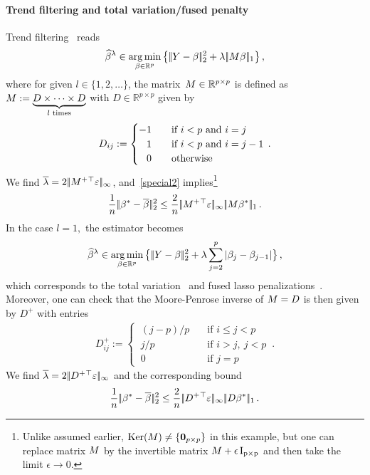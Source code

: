 \documentclass[bj]{imsart}
\newcommand{\normsup}[1]{\ensuremath{\!|\!| #1 | \! |_{\infty}}}
\newcommand{\normone}[1]{\ensuremath{\!|\!| #1 | \! |_{1}}}
\newcommand{\normtwo}[1]{\ensuremath{\!|\!| #1 | \! |_{2}}}
\newcommand{\1}{{\rm 1}\mskip -4,5mu{\rm l} }
\newcommand{\argmin}{\mathop{\mathrm{arg\,min}}}
\def\R{\mathbb{R}}
\newcommand{\rp}{\mathbb{R}^p}
\newcommand{\betatrue}{\beta^*}
\newcommand{\lo}{\overline{\lambda}}
\begin{document}
\paragraph{Trend filtering and total variation/fused penalty} Trend filtering~\cite{Kim09,Tibshirani14} reads
\begin{equation*}
  \estimatort \in \argmin_{\beta\in\rp}\big\{\,\normtwo{\outcome-\beta}^2+\tuningparameter\, \normone{\fusedmatrix\beta}\big\}\,,
\end{equation*}
where  for given $l\in\{1,2,\dots\}$, the matrix~$\fusedmatrix\in\R^{p\times p}$ is defined as $M:=\underbrace{D\times \cdots \times D}_{l\text{~times}}$ with $D\in\R^{p\times p}$ given by
\begin{align*}
 D_{ij}:=\begin{cases}
\textcolor{black}{-}1&\text{~~~if~}i<p\text{~and~}i=j\\
\textcolor{white}{-}1&\text{~~~if~}i<p\text{~and~}i=j-1\\
\textcolor{white}{-}0&\text{~~~otherwise}
\end{cases}\,.
\end{align*}
We find $\lo=2\,\normsup{\fusedmatrix^+{}^\top\noise}$, and~\eqref{special2} implies\footnote{Unlike assumed earlier, $\operatorname{Ker}(M)\neq \{\mathbf 0_{p\times p}\}$ in this example, but one can replace matrix $M$ by the invertible matrix $M+\epsilon\operatorname{I_{p\times p}}$ and then take the limit $\epsilon\to 0.$}
\begin{equation*}
\frac{1}{n}\,\normtwo{\betatrue-\estimatororacle}^2 \le \frac 2 n\,\normsup{\fusedmatrix^+{}^\top\noise}\,   \normone{\fusedmatrix\betatrue}\,.
\end{equation*}
In the case $l=1,$ the estimator becomes 
\begin{equation*}
  \estimatort \in \argmin_{\beta\in\rp}\big\{\,\normtwo{\outcome-\beta}^2+\tuningparameter\sum_{j=2}^p|\beta_j-\beta_{j-1}|\big\}\,,
\end{equation*}
which corresponds to the total variation~\cite{Rudin92} and fused lasso penalizations~\cite{Tibshirani05}. Moreover, one can check that the Moore-Penrose inverse of $M=D$ is then given by $D^+$ with entries
\begin{align*}
 D_{ij}^+:=\begin{cases}
~(j-p)/p&\text{~~~if~}i\leq j<p\\
~j/p&\text{~~~if~}i> j,~j<p\\
~0&\text{~~~if~}j=p
\end{cases}\,.
\end{align*}
We find  $\lo=2\,\normsup{D^+{}^\top\noise}$ and the corresponding bound
\begin{equation*}
\frac{1}{n}\,\normtwo{\betatrue-\estimatororacle}^2 \le \frac 2 n\,\normsup{D^+{}^\top\noise}\,   \normone{D\betatrue}\,.
\end{equation*}
\end{document}
